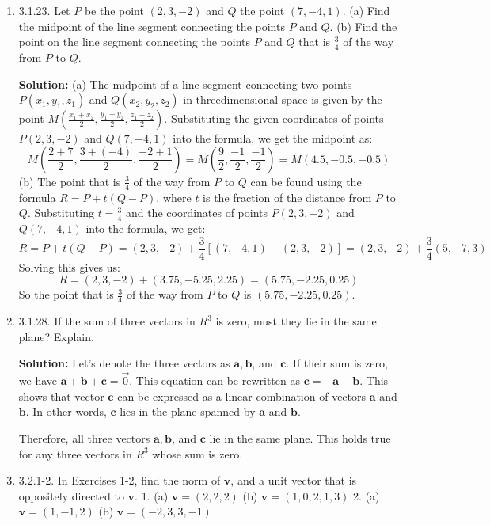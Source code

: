 \documentclass{article}
\begin{document}
\begin{enumerate}
\item 3.1.23. Let $P$ be the point $(2,3,-2)$ and $Q$ the point $(7,-4,1)$.
(a) Find the midpoint of the line segment connecting the points $P$ and $Q$.
(b) Find the point on the line segment connecting the points $P$ and $Q$ that is $\frac{3}{4}$ of the way from $P$ to $Q$.

  \textbf{Solution:}
  (a) The midpoint of a line segment connecting two points $P\left(x_1, y_1, z_1\right)$ and $Q\left(x_2, y_2, z_2\right)$ in threedimensional space is given by the point $M\left(\frac{x_1+x_2}{2}, \frac{y_1+y_2}{2}, \frac{z_1+z_2}{2}\right)$.
Substituting the given coordinates of points $P(2,3,-2)$ and $Q(7,-4,1)$ into the formula, we get the midpoint as:
$$
M\left(\frac{2+7}{2}, \frac{3+(-4)}{2}, \frac{-2+1}{2}\right)=M\left(\frac{9}{2}, \frac{-1}{2}, \frac{-1}{2}\right)=M(4.5,-0.5,-0.5)
$$
(b) The point that is $\frac{3}{4}$ of the way from $P$ to $Q$ can be found using the formula $R=P+t(Q-P)$, where $t$ is the fraction of the distance from $P$ to $Q$.
Substituting $t=\frac{3}{4}$ and the coordinates of points $P(2,3,-2)$ and $Q(7,-4,1)$ into the formula, we get:
$$
R=P+t(Q-P)=(2,3,-2)+\frac{3}{4}[(7,-4,1)-(2,3,-2)]=(2,3,-2)+\frac{3}{4}(5,-7,3)
$$
Solving this gives us:
$$
R=(2,3,-2)+(3.75,-5.25,2.25)=(5.75,-2.25,0.25)
$$
So the point that is $\frac{3}{4}$ of the way from $P$ to $Q$ is $(5.75,-2.25,0.25)$.

\item 3.1.28. If the sum of three vectors in $R^3$ is zero, must they lie in the same plane? Explain.

\textbf{Solution:} Let's denote the three vectors as $\mathbf{a}, \mathbf{b}$, and $\mathbf{c}$. If their sum is zero, we have $\mathbf{a}+\mathbf{b}+\mathbf{c}=\overrightarrow{0}$.
This equation can be rewritten as $\mathbf{c}=-\mathbf{a}-\mathbf{b}$.
This shows that vector $\mathbf{c}$ can be expressed as a linear combination of vectors $\mathbf{a}$ and $\mathbf{b}$. In other words, $\mathbf{c}$ lies in the plane spanned by $\mathbf{a}$ and $\mathbf{b}$.

Therefore, all three vectors $\mathbf{a}, \mathbf{b}$, and $\mathbf{c}$ lie in the same plane. This holds true for any three vectors in $R^3$ whose sum is zero.

\item 3.2.1-2. In Exercises 1-2, find the norm of $\mathbf{v}$, and a unit vector that is oppositely directed to $\mathbf{v}$.
1. (a) $\mathbf{v}=(2,2,2)$
(b) $\mathbf{v}=(1,0,2,1,3)$
2. (a) $\mathbf{v}=(1,-1,2)$
(b) $\mathbf{v}=(-2,3,3,-1)$
\end{enumerate}
\end{document}
